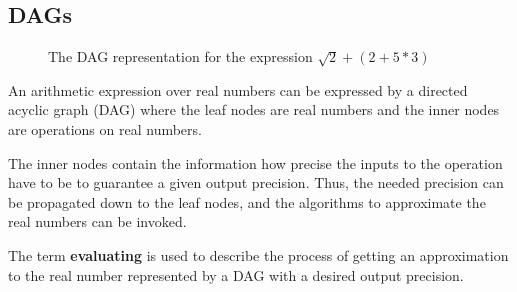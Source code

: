 	\subsection{DAGs}
  \begin{figure}[h]
      \centering
\caption{The DAG representation for the expression $\sqrt 2+(2 + 5*3)$}
    \end{figure}
		An arithmetic expression over real numbers can be expressed by a directed acyclic graph (DAG)
		where the leaf nodes are real numbers and the inner nodes are operations on real numbers.
		
    The inner nodes contain the information how precise the inputs to the
    operation have to be to guarantee a given output precision.
    Thus, the needed precision can be propagated down to the leaf nodes, and
    the algorithms to approximate the real numbers can be invoked.

    The term \textbf{evaluating} is used to describe the process of getting an approximation
    to the real number represented by a DAG with a desired output  precision.

